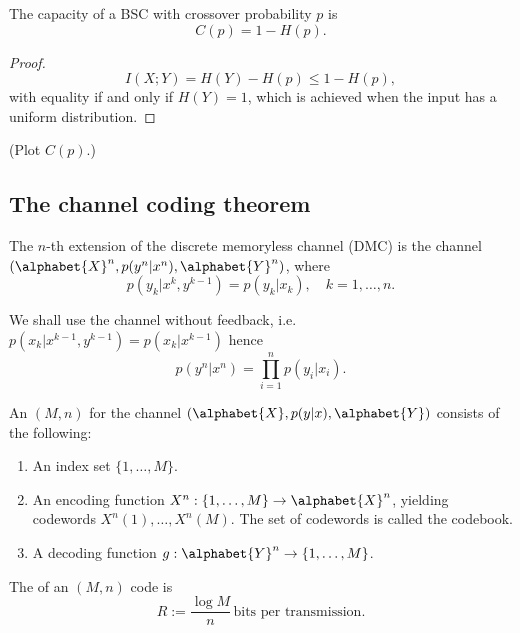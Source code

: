 \documentclass[a4paper, 11pt, openany]{book}
\begin{document}
    \begin{theorem}
    The capacity of a BSC with crossover probability $p$ is
    \[
        C(p) = 1 - H(p).
    \]
    \end{theorem}


    \begin{proof}
    $$
        I(X;Y) = H(Y) - H(p) \le 1 - H(p),
    $$
    with equality if and only if $H(Y) = 1$, which is achieved when the input has a uniform distribution.
    \end{proof}

    (Plot $C(p)$.)

    \subsection{The channel coding theorem}



    \begin{definition}
    The $n$-th extension of the discrete memoryless channel (DMC) is the channel $(\alphabet{X}^n, p(y^n | x^n), \alphabet{Y}^n)$, where
    $$
        p(y_k | x^k, y^{k-1}) = p(y_k | x_k), \quad k=1,\ldots,n.
    $$
    \end{definition}

    We shall use the channel without feedback, i.e. $p(x_k | x^{k-1}, y^{k-1}) = p(x_k | x^{k-1})$ hence
    $$
        p(y^n | x^n) = \prod_{i=1}^n p(y_i | x_i).
    $$





    \begin{definition}
    An $(M,n)$  for the channel $(\alphabet{X}, p(y|x), \alphabet{Y})$ consists of the following:
    \begin{enumerate}
        \item An index set $\{1,\ldots,M\}$.

        \item An encoding function $X^n : \{1,\ldots,M\} \to \alphabet{X}^n$, yielding codewords $X^n(1), \ldots, X^n(M)$. The set of codewords is called the codebook.

        \item A decoding function $g: \alphabet{Y}^n \to \{1,\ldots,M\}$.
    \end{enumerate}
    \end{definition}

    The  of an $(M,n)$ code is
    \[
        R := \frac{\log M}{n} \, \text{bits per transmission.}
    \]
\end{document}

